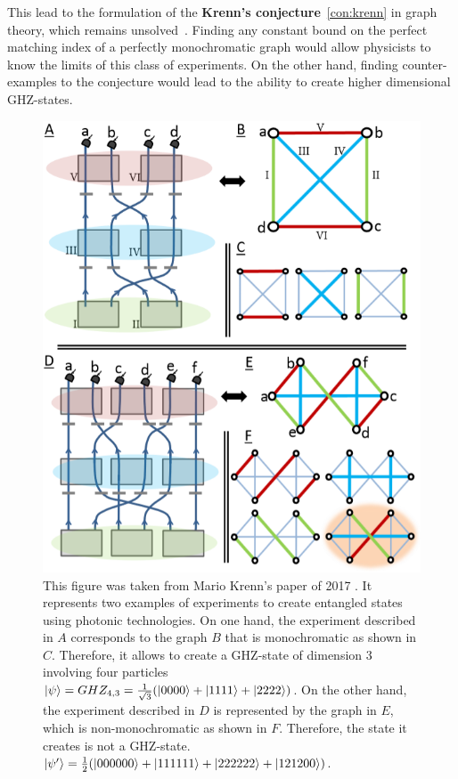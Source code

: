 This lead to the formulation of the \textbf{Krenn's conjecture}~\ref{con:krenn} in graph theory, which remains unsolved~\cite{wordpress}.
Finding any constant bound on the perfect matching index of a perfectly monochromatic graph would allow physicists to know the limits of this class of experiments.
On the other hand, finding counter-examples to the conjecture would lead to the ability to create higher dimensional GHZ-states. \\

\begin{figure}[H]
    \centering
    \includegraphics[scale=0.7]{figures/problem_presentation/motivations/krenn_graph}
    \caption{This figure was taken from Mario Krenn's paper of 2017 \cite{Krenn_2017}.
        It represents two examples of experiments to create entangled states using photonic technologies.
        On one hand, the experiment described in $A$ corresponds to the graph $B$ that is monochromatic as shown in $C$.
        Therefore, it allows to create a GHZ-state of dimension 3 involving four particles $\ket{\psi} = GHZ_{4, 3} = \frac{1}{\sqrt{3}} (\ket{0000} + \ket{1111} + \ket{2222})$.
        On the other hand, the experiment described in $D$ is represented by the graph in $E$, which is non-monochromatic as shown in $F$.
        Therefore, the state it creates is not a GHZ-state.
        $\ket{\psi'} = \frac{1}{2} (\ket{000000} + \ket{111111} + \ket{222222} + \ket{121200})$.}
    \label{fig:krenn_experiment}
\end{figure}

